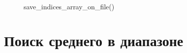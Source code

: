 \documentclass[12pt, a4paper]{article}
\begin{document}
\begin{figure}[H]
    \caption{save\_indices\_array\_on\_file()}
\end{figure}


\newpage
\section{Поиск среднего в диапазоне}

\end{document}

